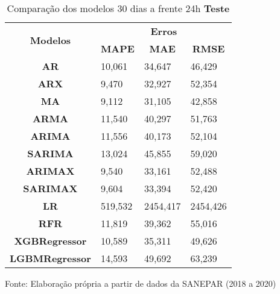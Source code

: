 \begin{table}[H]
	\centering
	\caption{Comparação dos modelos 30 dias a frente 24h \textbf{Teste} }\label{tb:60-24tst}
	\begin{tabular}{@{}clll@{}}
		\toprule
		\multirow{2}{*}{\textbf{Modelos}} & \multicolumn{3}{c}{\textbf{Erros}}                                                                       \\ \cmidrule(l){2-4} 
		& \multicolumn{1}{c}{\textbf{MAPE}} & \multicolumn{1}{c}{\textbf{MAE}} & \multicolumn{1}{c}{\textbf{RMSE}} \\ \hline
\textbf{AR}                       & 10,061                            & 34,647                           & 46,429                            \\
\textbf{ARX}                      & 9,470                             & 32,927                           & 52,354                            \\
\textbf{MA}                       & 9,112                             & 31,105                           & 42,858                            \\
\textbf{ARMA}                     & 11,540                            & 40,297                           & 51,763                            \\
\textbf{ARIMA}                    & 11,556                            & 40,173                           & 52,104                            \\
\textbf{SARIMA}                   & 13,024                            & 45,855                           & 59,020                            \\
\textbf{ARIMAX}                   & 9,540                             & 33,161                           & 52,488                            \\
\textbf{SARIMAX}                  & 9,604                             & 33,394                           & 52,420                            \\
\textbf{LR}        & 519,532                           & 2454,417                         & 2454,426                          \\
\textbf{RFR}  & 11,819                            & 39,362                           & 55,016                            \\
\textbf{XGBRegressor}             & 10,589                            & 35,311                           & 49,626                            \\
\textbf{LGBMRegressor}            & 14,593                            & 49,692                           & 63,239                            \\ \bottomrule
	\end{tabular}

Fonte: Elaboração própria a partir de dados da SANEPAR (2018 a 2020)
\end{table}

